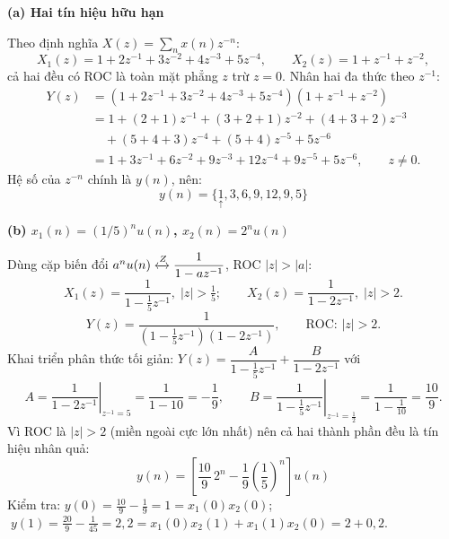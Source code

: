 \documentclass[12pt,a4paper]{article}
\begin{document}
\par\smallskip\noindent\textbf{(a) Hai tín hiệu hữu hạn}\par
Theo định nghĩa $X(z)=\sum_n x(n)z^{-n}$:
\[
X_1(z) = 1 + 2z^{-1} + 3z^{-2} + 4z^{-3} + 5z^{-4}, \qquad X_2(z) = 1 + z^{-1} + z^{-2},
\]
cả hai đều có ROC là toàn mặt phẳng $z$ trừ $z = 0$. Nhân hai đa thức theo $z^{-1}$:
\begin{align*}
Y(z) &= (1 + 2z^{-1} + 3z^{-2} + 4z^{-3} + 5z^{-4})(1 + z^{-1} + z^{-2}) \\
     &= 1 + (2+1)z^{-1} + (3+2+1)z^{-2} + (4+3+2)z^{-3} \\
     &\quad + (5+4+3)z^{-4} + (5+4)z^{-5} + 5z^{-6} \\
     &= 1 + 3z^{-1} + 6z^{-2} + 9z^{-3} + 12z^{-4} + 9z^{-5} + 5z^{-6}, \qquad z \neq 0.
\end{align*}
Hệ số của $z^{-n}$ chính là $y(n)$, nên:
\[
\boxed{\,y(n) = \{\underset{\uparrow}{1}, 3, 6, 9, 12, 9, 5\}\,}
\]

\par\smallskip\noindent\textbf{(b) $x_1(n) = (1/5)^n u(n)$, $x_2(n) = 2^n u(n)$}\par
Dùng cặp biến đổi $a^n u(n) \xleftrightarrow{Z} \dfrac{1}{1-az^{-1}}$, ROC $|z|>|a|$:
\[
X_1(z) = \frac{1}{1-\frac{1}{5}z^{-1}},\; |z| > \tfrac{1}{5}; \qquad
X_2(z) = \frac{1}{1-2z^{-1}},\; |z| > 2.
\]
\[
Y(z) = \frac{1}{\left(1-\frac{1}{5}z^{-1}\right)\left(1-2z^{-1}\right)}, \qquad \text{ROC: } |z| > 2.
\]
Khai triển phân thức tối giản: $Y(z) = \dfrac{A}{1-\frac{1}{5}z^{-1}} + \dfrac{B}{1-2z^{-1}}$ với
\[
A = \left.\frac{1}{1-2z^{-1}}\right|_{z^{-1}=5} = \frac{1}{1-10} = -\frac{1}{9}, \qquad
B = \left.\frac{1}{1-\frac{1}{5}z^{-1}}\right|_{z^{-1}=\frac{1}{2}} = \frac{1}{1-\frac{1}{10}} = \frac{10}{9}.
\]
Vì ROC là $|z|>2$ (miền ngoài cực lớn nhất) nên cả hai thành phần đều là tín hiệu nhân quả:
\[
\boxed{\,y(n) = \left[\frac{10}{9}\,2^n - \frac{1}{9}\left(\frac{1}{5}\right)^n\right]u(n)\,}
\]
Kiểm tra: $y(0) = \frac{10}{9}-\frac{1}{9} = 1 = x_1(0)x_2(0)$; $\;y(1) = \frac{20}{9} - \frac{1}{45} = 2{,}2 = x_1(0)x_2(1) + x_1(1)x_2(0) = 2 + 0{,}2$. \checkmark
\end{document}

